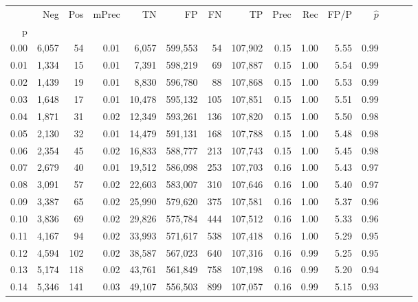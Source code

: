 \begin{tabular}{rrrrrrrrrrrrrrr}
\toprule
{} &     Neg &    Pos & mPrec &       TN &       FP &       FN &       TP &  Prec &   Rec &  FP/P & $\hat{p}$ \\
p    &         &        &       &          &          &          &          &       &       &       &           \\
\midrule
0.00 &   6,057 &     54 &  0.01 &    6,057 &  599,553 &       54 &  107,902 &  0.15 &  1.00 &  5.55 &      0.99 \\
0.01 &   1,334 &     15 &  0.01 &    7,391 &  598,219 &       69 &  107,887 &  0.15 &  1.00 &  5.54 &      0.99 \\
0.02 &   1,439 &     19 &  0.01 &    8,830 &  596,780 &       88 &  107,868 &  0.15 &  1.00 &  5.53 &      0.99 \\
0.03 &   1,648 &     17 &  0.01 &   10,478 &  595,132 &      105 &  107,851 &  0.15 &  1.00 &  5.51 &      0.99 \\
0.04 &   1,871 &     31 &  0.02 &   12,349 &  593,261 &      136 &  107,820 &  0.15 &  1.00 &  5.50 &      0.98 \\
0.05 &   2,130 &     32 &  0.01 &   14,479 &  591,131 &      168 &  107,788 &  0.15 &  1.00 &  5.48 &      0.98 \\
0.06 &   2,354 &     45 &  0.02 &   16,833 &  588,777 &      213 &  107,743 &  0.15 &  1.00 &  5.45 &      0.98 \\
0.07 &   2,679 &     40 &  0.01 &   19,512 &  586,098 &      253 &  107,703 &  0.16 &  1.00 &  5.43 &      0.97 \\
0.08 &   3,091 &     57 &  0.02 &   22,603 &  583,007 &      310 &  107,646 &  0.16 &  1.00 &  5.40 &      0.97 \\
0.09 &   3,387 &     65 &  0.02 &   25,990 &  579,620 &      375 &  107,581 &  0.16 &  1.00 &  5.37 &      0.96 \\
0.10 &   3,836 &     69 &  0.02 &   29,826 &  575,784 &      444 &  107,512 &  0.16 &  1.00 &  5.33 &      0.96 \\
0.11 &   4,167 &     94 &  0.02 &   33,993 &  571,617 &      538 &  107,418 &  0.16 &  1.00 &  5.29 &      0.95 \\
0.12 &   4,594 &    102 &  0.02 &   38,587 &  567,023 &      640 &  107,316 &  0.16 &  0.99 &  5.25 &      0.95 \\
0.13 &   5,174 &    118 &  0.02 &   43,761 &  561,849 &      758 &  107,198 &  0.16 &  0.99 &  5.20 &      0.94 \\
0.14 &   5,346 &    141 &  0.03 &   49,107 &  556,503 &      899 &  107,057 &  0.16 &  0.99 &  5.15 &      0.93 \\

\end{tabular}
